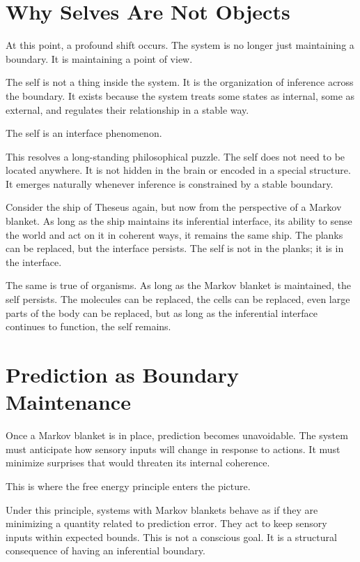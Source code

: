 \documentclass[
  openright]{book}
\begin{document}
\section{Why Selves Are Not Objects}\label{why-selves-are-not-objects}

At this point, a profound shift occurs. The system is no longer just
maintaining a boundary. It is maintaining a point of view.

The self is not a thing inside the system. It is the
organization of inference across the
boundary. It exists because the system treats some
states as internal, some as external, and regulates their relationship
in a stable way.

The self is an interface phenomenon.

This resolves a long-standing philosophical puzzle. The self does not
need to be located anywhere. It is not hidden in the brain or encoded in
a special structure. It emerges naturally whenever inference is
constrained by a stable boundary.

Consider the ship of Theseus again, but now from the perspective of a
Markov blanket. As long as the ship maintains its inferential interface,
its ability to sense the world and act on it in coherent ways, it
remains the same ship. The planks can be replaced, but the interface
persists. The self is not in the planks; it is in the interface.

The same is true of organisms. As long as the Markov blanket is
maintained, the self persists. The molecules can be replaced, the cells
can be replaced, even large parts of the body can be replaced, but as
long as the inferential interface continues to function, the self
remains.

\section{Prediction as Boundary
Maintenance}\label{prediction-as-boundary-maintenance}

Once a Markov blanket is in place, prediction becomes unavoidable. The
system must anticipate how sensory inputs will change in response to
actions. It must minimize surprises that would threaten its internal
coherence.

This is where the free energy principle
enters the picture.

Under this principle, systems with Markov blankets behave as if they are
minimizing a quantity related to prediction error.
They act to keep sensory inputs within expected bounds. This is not a
conscious goal. It is a structural consequence of having an inferential
boundary.
\end{document}
